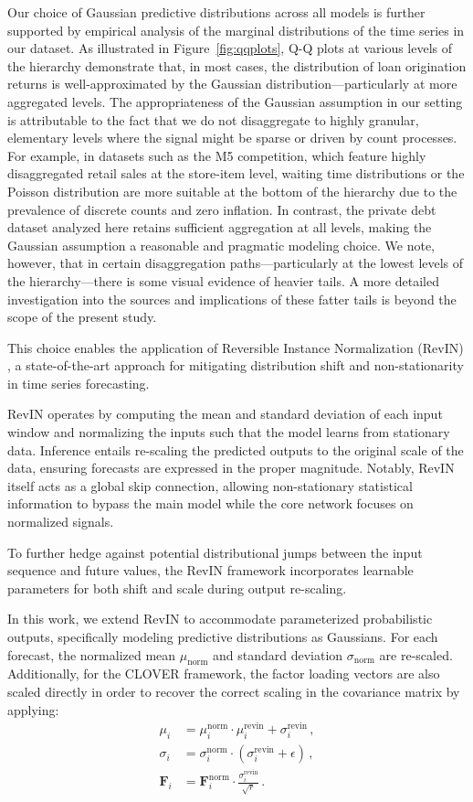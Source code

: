 \documentclass[letterpaper]{article}
\begin{document}
Our choice of Gaussian predictive distributions across all models is further supported by empirical analysis of the marginal distributions of the time series in our dataset. As illustrated in Figure~\ref{fig:qqplots}, Q-Q plots at various levels of the hierarchy demonstrate that, in most cases, the distribution of loan origination returns is well-approximated by the Gaussian distribution—particularly at more aggregated levels. The appropriateness of the Gaussian assumption in our setting is attributable to the fact that we do not disaggregate to highly granular, elementary levels where the signal might be sparse or driven by count processes. For example, in datasets such as the M5 competition, which feature highly disaggregated retail sales at the store-item level, waiting time distributions or the Poisson distribution are more suitable at the bottom of the hierarchy due to the prevalence of discrete counts and zero inflation. In contrast, the private debt dataset analyzed here retains sufficient aggregation at all levels, making the Gaussian assumption a reasonable and pragmatic modeling choice.  We note, however, that in certain disaggregation paths—particularly at the lowest levels of the hierarchy—there is some visual evidence of heavier tails. A more detailed investigation into the sources and implications of these fatter tails is beyond the scope of the present study.

This choice enables the application of Reversible Instance Normalization (RevIN) \cite{revin}, a state-of-the-art approach for mitigating distribution shift and non-stationarity in time series forecasting.

RevIN operates by computing the mean and standard deviation of each input window and normalizing the inputs such that the model learns from stationary data. Inference entails re-scaling the predicted outputs to the original scale of the data, ensuring forecasts are expressed in the proper magnitude. Notably, RevIN itself acts as a global skip connection, allowing non-stationary statistical information to bypass the main model while the core network focuses on normalized signals.

To further hedge against potential distributional jumps between the input sequence and future values, the RevIN framework incorporates learnable parameters for both shift and scale during output re-scaling.

In this work, we extend RevIN to accommodate parameterized probabilistic outputs, specifically modeling predictive distributions as Gaussians. For each forecast, the normalized mean $\mu_{\text{norm}}$ and standard deviation $\sigma_{\text{norm}}$ are re-scaled. Additionally, for the CLOVER framework, the factor loading vectors are also scaled directly in order to recover the correct scaling in the covariance matrix by applying: 
\begin{align*}
    \mu_i &= \mu_{i}^\text{norm} \cdot \mu_i^\text{revin} + \sigma_i^\text{revin}  \,,\\
    \sigma_i &= \sigma_{i}^\text{norm} \cdot (\sigma_i^\text{revin}+ \epsilon) \,, \\
    \mathbf{F}_{i} &= \mathbf{F}^\text{norm}_i \cdot \frac{\sigma_i^\text{revin}}{\sqrt{r}}\,.
\end{align*}
\end{document}
